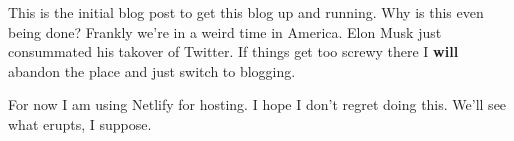 This is the initial blog post to get this blog up and running. Why is
this even being done? Frankly we're in a weird time in America. Elon
Musk just consummated his takover of Twitter. If things get too screwy
there I \textbf{will} abandon the place and just switch to blogging.

For now I am using Netlify for hosting. I hope I don't regret doing
this. We'll see what erupts, I suppose.
